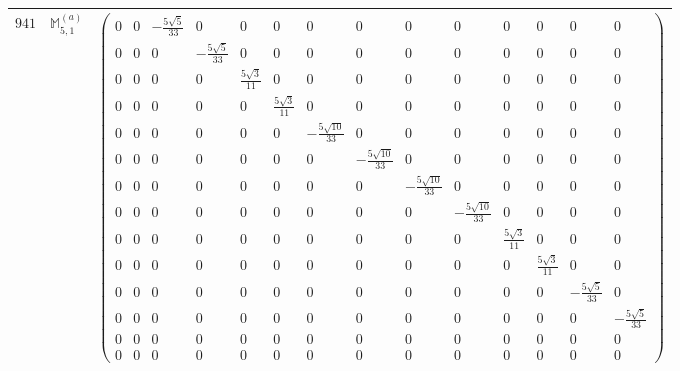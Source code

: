 \documentclass[fleqn,8pt,landscape]{jsarticle}
\begin{document}
\begin{center}
\begin{longtable}{ccc}
$ 941 $ & $ \mathbb{M}_{5,1}^{(a)} $ & $ \begin{pmatrix} 0 & 0 & - \frac{5 \sqrt{5}}{33} & 0 & 0 & 0 & 0 & 0 & 0 & 0 & 0 & 0 & 0 & 0 \\ 0 & 0 & 0 & - \frac{5 \sqrt{5}}{33} & 0 & 0 & 0 & 0 & 0 & 0 & 0 & 0 & 0 & 0 \\ 0 & 0 & 0 & 0 & \frac{5 \sqrt{3}}{11} & 0 & 0 & 0 & 0 & 0 & 0 & 0 & 0 & 0 \\ 0 & 0 & 0 & 0 & 0 & \frac{5 \sqrt{3}}{11} & 0 & 0 & 0 & 0 & 0 & 0 & 0 & 0 \\ 0 & 0 & 0 & 0 & 0 & 0 & - \frac{5 \sqrt{10}}{33} & 0 & 0 & 0 & 0 & 0 & 0 & 0 \\ 0 & 0 & 0 & 0 & 0 & 0 & 0 & - \frac{5 \sqrt{10}}{33} & 0 & 0 & 0 & 0 & 0 & 0 \\ 0 & 0 & 0 & 0 & 0 & 0 & 0 & 0 & - \frac{5 \sqrt{10}}{33} & 0 & 0 & 0 & 0 & 0 \\ 0 & 0 & 0 & 0 & 0 & 0 & 0 & 0 & 0 & - \frac{5 \sqrt{10}}{33} & 0 & 0 & 0 & 0 \\ 0 & 0 & 0 & 0 & 0 & 0 & 0 & 0 & 0 & 0 & \frac{5 \sqrt{3}}{11} & 0 & 0 & 0 \\ 0 & 0 & 0 & 0 & 0 & 0 & 0 & 0 & 0 & 0 & 0 & \frac{5 \sqrt{3}}{11} & 0 & 0 \\ 0 & 0 & 0 & 0 & 0 & 0 & 0 & 0 & 0 & 0 & 0 & 0 & - \frac{5 \sqrt{5}}{33} & 0 \\ 0 & 0 & 0 & 0 & 0 & 0 & 0 & 0 & 0 & 0 & 0 & 0 & 0 & - \frac{5 \sqrt{5}}{33} \\ 0 & 0 & 0 & 0 & 0 & 0 & 0 & 0 & 0 & 0 & 0 & 0 & 0 & 0 \\ 0 & 0 & 0 & 0 & 0 & 0 & 0 & 0 & 0 & 0 & 0 & 0 & 0 & 0 \end{pmatrix} $ \\ \hline

\end{longtable}
\end{center}
\end{document}
